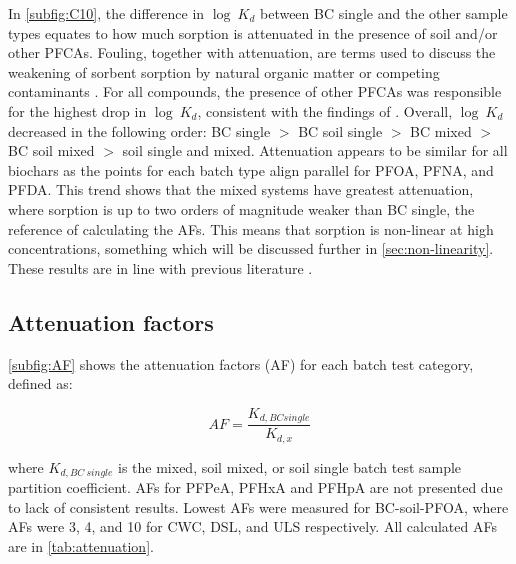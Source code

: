 In \cref{subfig:C10}, the difference in $\log~K_d$ between BC single and the other sample types equates to how much sorption is attenuated in the presence of soil and/or other PFCAs. Fouling, together with attenuation, are terms used to discuss the weakening of sorbent sorption by natural organic matter or competing contaminants \citep{Werner2006}. For all compounds, the presence of other PFCAs was responsible for the highest drop in $\log~K_d$, consistent with the findings of \cite{Cornelissen2006}. Overall, $\log~K_d$ decreased in the following order: BC single $>$ BC soil single $>$ BC mixed $>$ BC soil mixed $>$ soil single and mixed. Attenuation appears to be similar for all biochars as the points for each batch type align parallel for PFOA, PFNA, and PFDA. This trend shows that the mixed systems have greatest attenuation, where sorption is up to two orders of magnitude weaker than BC single, the reference of calculating the AFs. This means that sorption is non-linear at high concentrations, something which will be discussed further in \cref{sec:non-linearity}. These results are in line with previous literature \citep{deng2010removal, zhou2010sorption}.

\subsection{Attenuation factors}
\cref{subfig:AF} shows the attenuation factors (\acrshort{AF}) for each batch test category, defined as:

\begin{equation} \label{eq:AF}
    AF = \frac{K_{d,BC single}}{K_{d,x}}
\end{equation}

where $K_{d,BC~single}$ is the mixed, soil mixed, or soil single batch test sample partition coefficient. AFs for PFPeA, PFHxA and PFHpA are not presented due to lack of consistent results. Lowest AFs were measured for BC-soil-PFOA, where AFs were 3, 4, and 10 for CWC, DSL, and ULS respectively. All calculated AFs are in \cref{tab:attenuation}. 

